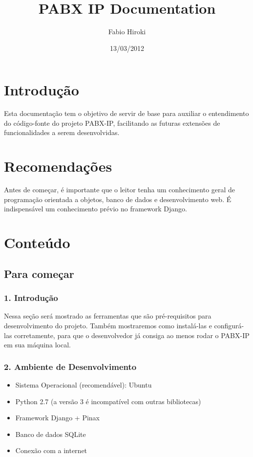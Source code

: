\documentclass[letterpaper,10pt,brazil]{sphinxmanual}
\title{PABX IP Documentation}
\date{13/03/2012}
\author{Fabio Hiroki}
\begin{document}
\maketitle
\tableofcontents
{}\label{index::doc}



\chapter{Introdução}
\label{index:bem-vindo-a-documentacao-do-projeto-pabx-ip}\label{index:introducao}
Esta documentação tem o objetivo de servir de base para auxiliar o entendimento do código-fonte do projeto PABX-IP, facilitando as futuras extensões de funcionalidades a serem desenvolvidas.


\chapter{Recomendações}
\label{index:recomendacoes}
Antes de começar, é importante que o leitor tenha um conhecimento geral de programação orientada a objetos, banco de dados e desenvolvimento web. É indispensável um conhecimento prévio no framework Django.


\chapter{Conteúdo}
\label{index:conteudo}

\section{Para começar}
\label{inicio::doc}\label{inicio:para-comecar}

\subsection{1. Introdução}
\label{inicio:introducao}
Nessa seção será mostrado as ferramentas que são pré-requisitos para desenvolvimento do projeto. Também mostraremos como instalá-las e configurá-las corretamente, para que o desenvolvedor já consiga ao menos rodar o PABX-IP em sua máquina local.


\subsection{2. Ambiente de Desenvolvimento}
\label{inicio:ambiente-de-desenvolvimento}\begin{itemize}
\item {} 
Sistema Operacional (recomendável): Ubuntu

\item {} 
Python 2.7 (a versão 3 é incompatível com outras bibliotecas)

\item {} 
Framework Django + Pinax

\item {} 
Banco de dados SQLite

\item {} 
Conexão com a internet

\end{itemize}
\end{document}
